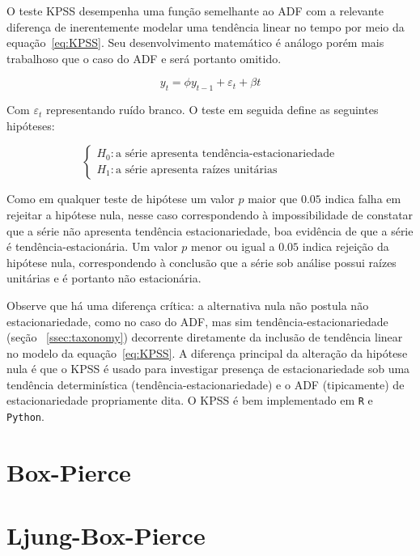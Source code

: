 O teste KPSS desempenha uma função semelhante ao ADF com a relevante
diferença de inerentemente modelar uma tendência linear no tempo por meio da
equação~\ref{eq:KPSS}. Seu desenvolvimento matemático é análogo porém mais
trabalhoso que o caso do ADF e será portanto omitido.

\begin{equation}\label{eq:KPSS}
    y_t = \phi y_{t-1} + \varepsilon_t + \beta t
\end{equation}

Com $\varepsilon_t$ representando ruído branco. O teste em seguida define as
seguintes hipóteses:

$$
\begin{cases}
    H_0: \text{a série apresenta tendência-estacionariedade} \\
    H_1: \text{a série apresenta raízes unitárias}
\end{cases}
$$

Como em qualquer teste de hipótese um valor $p$ maior que $0.05$ indica falha
em rejeitar a hipótese nula, nesse caso correspondendo à impossibilidade de
constatar que a série não apresenta tendência estacionariedade, boa evidência
de que a série é tendência-estacionária. Um valor $p$ menor ou igual a $0.05$
indica rejeição da hipótese nula, correspondendo à conclusão que a série sob
análise possui raízes unitárias e é portanto não estacionária.

Observe que há uma diferença crítica: a alternativa nula não postula não
estacionariedade, como no caso do ADF, mas sim tendência-estacionariedade
(seção ~\ref{ssec:taxonomy}) decorrente diretamente da inclusão de tendência
linear no modelo da equação~\ref{eq:KPSS}. A diferença principal da alteração
da hipótese nula é que o KPSS é usado para investigar presença de
estacionariedade sob uma tendência determinística (tendência-estacionariedade)
e o ADF (tipicamente) de estacionariedade propriamente dita. O KPSS é bem
implementado em \verb+R+ e \verb+Python+.

\section{Box-Pierce}

\section{Ljung-Box-Pierce}
